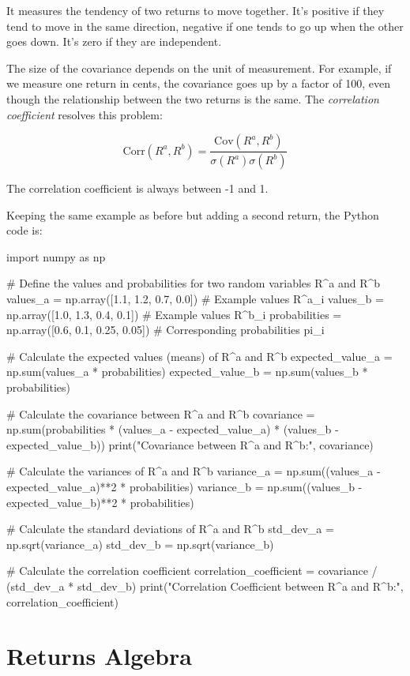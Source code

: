 It measures the tendency of two returns to move 
together. It's positive if they tend to move in the 
same direction, negative if one tends to go up when
the other goes down. It's zero if they are independent.

The size of the covariance depends on the unit 
of measurement. For example, if we measure 
one return in cents, the covariance goes up by 
a factor of 100, even though the relationship
between the two returns is the same. The 
\textit{correlation coefficient} resolves this problem:

\begin{equation}
    \text{Corr}(R^a, R^b) = \frac{\text{Cov}(R^a, R^b)}{\sigma(R^a)\sigma(R^b)}
\end{equation}

The correlation coefficient is always between -1 and 1.

Keeping the same example as before but adding a second return, 
the Python code is:

\begin{python}
import numpy as np

# Define the values and probabilities for two random variables R^a and R^b
values_a = np.array([1.1, 1.2, 0.7, 0.0])  # Example values R^a_i
values_b = np.array([1.0, 1.3, 0.4, 0.1])  # Example values R^b_i
probabilities = np.array([0.6, 0.1, 0.25, 0.05])  # Corresponding probabilities pi_i

# Calculate the expected values (means) of R^a and R^b
expected_value_a = np.sum(values_a * probabilities)
expected_value_b = np.sum(values_b * probabilities)

# Calculate the covariance between R^a and R^b
covariance = np.sum(probabilities * (values_a - expected_value_a) * (values_b - expected_value_b))
print("Covariance between R^a and R^b:", covariance)

# Calculate the variances of R^a and R^b
variance_a = np.sum((values_a - expected_value_a)**2 * probabilities)
variance_b = np.sum((values_b - expected_value_b)**2 * probabilities)

# Calculate the standard deviations of R^a and R^b
std_dev_a = np.sqrt(variance_a)
std_dev_b = np.sqrt(variance_b)

# Calculate the correlation coefficient
correlation_coefficient = covariance / (std_dev_a * std_dev_b)
print("Correlation Coefficient between R^a and R^b:", correlation_coefficient)
\end{python}

\section{Returns Algebra}

